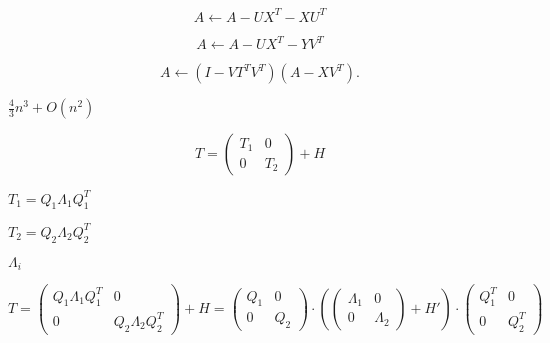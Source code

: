 {\newpage\clearpage
{}%
\begin{displaymath}A \leftarrow A - U X^T - X U^T\end{displaymath}%
\lthtmldisplayZ
\lthtmlcheckvsize\clearpage}

{\newpage\clearpage
{}%
\begin{displaymath}A \leftarrow A - U X^T - Y V^T\end{displaymath}%
\lthtmldisplayZ
\lthtmlcheckvsize\clearpage}

{\newpage\clearpage
{}%
\begin{displaymath}A \leftarrow (I - V T^T V^T)(A - X V^T).\end{displaymath}%
\lthtmldisplayZ
\lthtmlcheckvsize\clearpage}

{\newpage\clearpage
{}%
$\frac{4}{3}n^3 + O(n^2)$%
\lthtmlinlinemathZ
\lthtmlcheckvsize\clearpage}

{\newpage\clearpage
{}%
\begin{displaymath}
T = \left( \begin{array}{cc} T_1 & 0 \\0 & T_2 \end{array} \right) + H
\end{displaymath}%
\lthtmldisplayZ
\lthtmlcheckvsize\clearpage}

{\newpage\clearpage
{}%
$T_1 = Q_1 \Lambda_1 Q_1^T$%
\lthtmlinlinemathZ
\lthtmlcheckvsize\clearpage}

{\newpage\clearpage
{}%
$T_2 = Q_2 \Lambda_2 Q_2^T$%
\lthtmlinlinemathZ
\lthtmlcheckvsize\clearpage}

{\newpage\clearpage
{}%
$\Lambda_i$%
\lthtmlinlinemathZ
\lthtmlcheckvsize\clearpage}

{\newpage\clearpage
{}%
\begin{displaymath}
T = \left( \begin{array}{cc} Q_1 \Lambda_1 Q_1^T & 0 \\0 &  Q_2 \Lambda_2 Q_2^T \end{array} \right) + H
=
\left( \begin{array}{cc} Q_1 & 0 \\0 & Q_2 \end{array} \right) \cdot
\left( \left( \begin{array}{cc} \Lambda_1 & 0 \\0 & \Lambda_2 \end{array} \right) + H' \right) \cdot
\left( \begin{array}{cc} Q_1^T & 0 \\0 & Q_2^T \end{array} \right) 
\end{displaymath}%
\lthtmldisplayZ
\lthtmlcheckvsize\clearpage}

